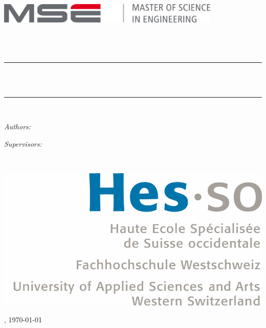 \documentclass[a4paper,11pt,oneside]{book}
\newcommand{\HRule}{\rule{\linewidth}{0.5mm}}
\begin{document}
\begin{titlepage}
    \begin{center}

        \includegraphics[width=0.8\textwidth]{img/mse_logo}~\\[1.5cm]
        \textsc{\Large \School}\\[0.25cm]
        \textsc{\Large \Faculty}\\[1.5cm]
        \textsc{\LARGE \Course}\\[0.5cm]

        \HRule \\[0.4cm]
        { \huge \bfseries \Title\\[0.4cm] }
        \HRule \\[1.5cm]

        \begin{minipage}[t]{0.4\textwidth}
            \begin{flushleft} \Large
                \emph{Authors:}\\ \Authors
            \end{flushleft}
        \end{minipage}
        \begin{minipage}[t]{0.4\textwidth}
            \begin{flushright} \Large
                \emph{Supervisors:}\\\Supervisors
            \end{flushright}
        \end{minipage}~\\[1.5cm]

        \begin{center}
            \includegraphics[scale=0.7]{img/logo_hes-so}
        \end{center}

        \vfill

        {\large \Place, \today}

    \end{center}
\end{titlepage}
\end{document}
